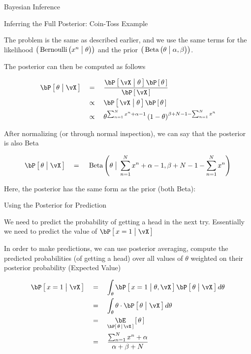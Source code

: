 \documentclass{article}
\begin{document}
\begin{ssection}{Bayesian Inference}
	\begin{ssubsection}{Inferring the Full Posterior: Coin-Toss Example}

		The problem is the same as described earlier, and we use the same terms for the likelihood $\para{\tfunc{Bernoulli}{x^n \pipe \theta}}$ and the prior $\para{\tfunc{Beta}{\theta \pipe \alpha, \beta}}$. \br

		The posterior can then be computed as follows

		\begin{align*}
			\prob{\theta \pipe \vX}	&\eq	\frac{\prob{\vX \pipe \theta} \prob{\theta}}{\prob{\vX}} \\
									&\qprop	\prob{\vX \pipe \theta}	\prob{\theta} \\
									&\qprop	\theta^{\sum_{n = 1}^N x^n + \alpha - 1} \para{1 - \theta}^{\beta + N - 1 - \sum_{n = 1}^N x^n}
		\end{align*}

		After normalizing (or through normal inspection), we can say that the posterior is also Beta

		\begin{align*}
			\prob{\theta \pipe \vX}	\eq	\tfunc{Beta}{\theta \pipe \sum_{n = 1}^N x^n + \alpha - 1, \beta + N - 1 - \sum_{n = 1}^N x^n}
		\end{align*}

		Here, the posterior has the same form as the prior (both Beta): 

	\end{ssubsection}

	\begin{ssubsection}{Using the Posterior for Prediction}

		We need to predict the probability of getting a head in the next try. Essentially we need to predict the value of $\prob{x = 1 \pipe \vX}$ \br
		
		In order to make predictions, we can use posterior averaging,  compute the predicted probabilities (of getting a head) over all values of $\theta$ weighted on their posterior probability (Expected Value)

		\begin{align*}
			\prob{x = 1 \pipe \vX}	&\eq	\int_{\theta} \prob{x = 1 \pipe \theta, \vX} \prob{\theta \pipe \vX} d\theta \\
									&\eq	\int_{\theta} \theta \cdot \prob{\theta \pipe \vX} d\theta \\
									&\eq	\E[\prob{\theta \,|\, \vX}]{\theta} \\
									&\eq	\frac{\sum_{n = 1}^N x^n + \alpha}{\alpha + \beta + N}
		\end{align*}


\end{ssubsection}
\end{ssection}
\end{document}
